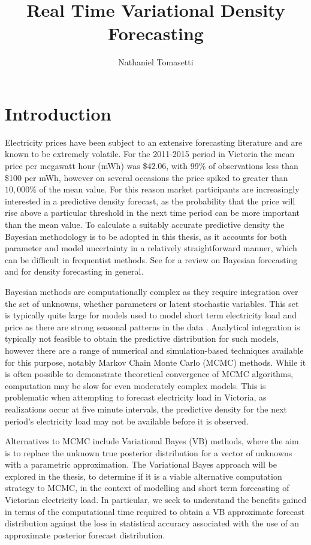 \documentclass[12pt,a4paper]{article}%
\title{Real Time Variational Density Forecasting}
\author{Nathaniel Tomasetti}
\numberwithin{equation}{section}
\begin{document}
\maketitle
\tableofcontents
\section{Introduction} \label{sec:Intro}

Electricity prices have been subject to an extensive forecasting literature and are known to be extremely volatile. For the 2011-2015 period in Victoria the mean price per megawatt hour (mWh) was \$42.06, with 99\% of observations less than \$100 per mWh, however on several occasions the price spiked to greater than $10,000\%$ of the mean value. For this reason market participants are increasingly interested in a predictive density forecast, as the probability that the price will rise above a particular threshold in the next time period can be more important than the mean value. To calculate a suitably accurate predictive density the Bayesian methodology is to be adopted in this thesis, as it accounts for both parameter and model uncertainty in a relatively straightforward manner, which can be difficult in frequentist methods. See \citet{Geweke2006} for a review on Bayesian forecasting and \citet{Gneiting2014} for density forecasting in general. 

Bayesian methods are computationally complex as they require integration over the set of unknowns, whether parameters or latent stochastic variables. This set is typically quite large for models used to model short term electricity load and price as there are strong seasonal patterns in the data \citep{Taylor2003}. Analytical integration is typically not feasible to obtain the predictive distribution for such models, however there are a range of numerical and simulation-based techniques available for this purpose, notably Markov Chain Monte Carlo (MCMC) methods. While it is often possible to demonstrate theoretical convergence of MCMC algorithms, computation may be slow for even moderately complex models. This is problematic when attempting to forecast electricity load in Victoria, as realizations occur at five minute intervals, the predictive density for the next period's electricity load may not be available before it is observed.

Alternatives to MCMC include Variational Bayes (VB) methods, where the aim is to replace the unknown true posterior distribution for a vector of unknowns with a parametric approximation. The Variational Bayes approach will be explored in the thesis, to determine if it is a viable alternative computation strategy to MCMC, in the context of modelling and short term forecasting of Victorian electricity load. In particular, we seek to understand the benefits gained in terms of the computational time required to obtain a VB approximate forecast distribution against the loss in statistical accuracy associated with the use of an approximate posterior forecast distribution. 
\end{document}
